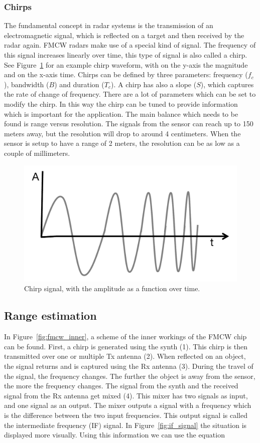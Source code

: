 \subsubsection{Chirps}
The fundamental concept in radar systems is the transmission of an electromagnetic signal, which is reflected on a target and then received by the radar again. FMCW radars make use of a special kind of signal. The frequency of this signal increases linearly over time, this type of signal is also called a chirp. See Figure~\ref{fig:chirp} for an example chirp waveform, with on the y-axis the magnitude and on the x-axis time. Chirps can be defined by three parameters: frequency ($f_c$), bandwidth ($B$) and duration ($T_c$). A chirp has also a slope ($S$), which captures the rate of change of frequency. There are a lot of parameters which can be set to modify the chirp. In this way the chirp can be tuned to provide information which is important for the application. The main balance which needs to be found is range versus resolution. The signals from the sensor can reach up to 150 meters away, but the resolution will drop to around 4 centimeters. When the sensor is setup to have a range of 2 meters, the resolution can be as low as a couple of millimeters.

\begin{figure}[t]
\centering
\includegraphics[width=.5\textwidth]{figures/background/chirp.png}
\caption{Chirp signal, with the amplitude as a function over time.}
\label{fig:chirp}
\end{figure}

\subsection{Range estimation}
In Figure~\ref{fig:fmcw_inner}, a scheme of the inner workings of the FMCW chip can be found. First, a chirp is generated using the synth (1). This chirp is then transmitted over one or multiple Tx antenna (2). When reflected on an object, the signal returns and is captured using the Rx antenna (3). During the travel of the signal, the frequency changes. The further the object is away from the sensor, the more the frequency changes. The signal from the synth and the received signal from the Rx antenna get mixed (4). This mixer has two signals as input, and one signal as an output. The mixer outputs a signal with a frequency which is the difference between the two input frequencies. This output signal is called the intermediate frequency (IF) signal. In Figure~\ref{fig:if_signal} the situation is displayed more visually. Using this information we can use the equation

